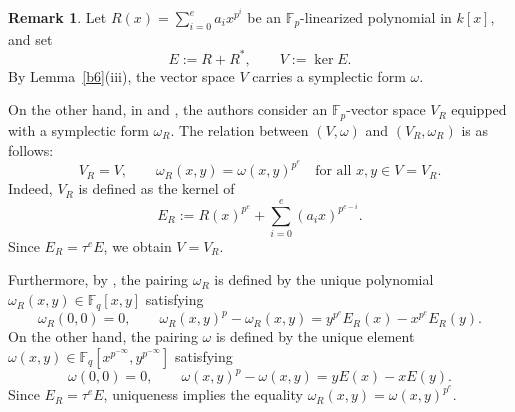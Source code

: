 \documentclass[12pt,a4paper]{amsart}
\theoremstyle{definition}
\newtheorem{remark}[theorem]{Remark}
\def\F{{\mathbb F}}
\theoremstyle{remark}
\begin{document}
\begin{remark}\label{omega in ITT0}
Let $R(x)=\sum_{i=0}^ea_ix^{p^i}$ be an $\F_p$-linearized polynomial in $k[x]$, and set 
\[E:=R+R^\ast,\qquad V:=\ker E. 
\]
By Lemma~\ref{b6}(iii), the vector space $V$ carries a symplectic form $\omega$. 

On the other hand, in \cite{ITT0} and \cite{TT}, the authors consider an $\F_p$-vector space $V_R$ equipped with a symplectic form $\omega_R$. 
The relation between $(V,\omega)$ and $(V_R,\omega_R)$ is as follows: 
\[
V_R=V,\qquad \omega_R(x,y)=\omega(x,y)^{p^e}\quad\text{for all }x,y\in V=V_R. 
\]
Indeed, $V_R$ is defined as the kernel of 
\[
E_R:=R(x)^{p^e}+\sum_{i=0}^e (a_ix)^{p^{e-i}}. 
\]
 Since $E_R=\tau^e E$, we obtain $V=V_R$. 

 Furthermore, by \cite[(2.5)]{ITT0}, the pairing $\omega_R$ is defined by the unique polynomial $\omega_R(x,y)\in\F_q[x,y]$ satisfying 
\[
\omega_R(0,0)=0,\qquad \omega_R(x,y)^p-\omega_R(x,y)=y^{p^e}E_R(x)-x^{p^e}E_R(y). 
\]
On the other hand, the pairing $\omega$ is defined by the unique element $\omega(x,y)\in\F_q[x^{p^{-\infty}},y^{p^{-\infty}}]$ satisfying 
\[
\omega(0,0)=0,\qquad \omega(x,y)^p-\omega(x,y)=yE(x)-xE(y). 
\]
Since $E_R=\tau^e E$, uniqueness implies the equality $\omega_R(x,y)=\omega(x,y)^{p^e}$. 
\end{remark}
\end{document}
